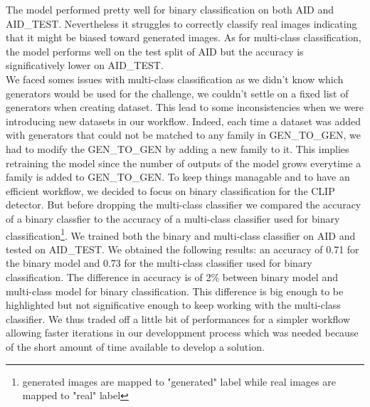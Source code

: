 \documentclass[12pt,a4paper]{article}
\begin{document}
The model performed pretty well for binary classification on both AID and AID\_TEST. Nevertheless it struggles to correctly classify real images indicating that it might be biased toward generated images. As for multi-class classification, the model performs well on the test split of AID but the accuracy is significatively lower on AID\_TEST.\\


We faced somes issues with multi-class classification as we didn't know which generators would be used for the challenge, we couldn't settle on a fixed list of generators when creating dataset. This lead to some inconsistencies when we were introducing new datasets in our workflow. Indeed, each time a dataset was added with generators that could not be matched to any family in GEN\_TO\_GEN, we had to modify the GEN\_TO\_GEN by adding a new family to it. This implies retraining the model since the number of outputs of the model grows everytime a family is added to GEN\_TO\_GEN. To keep things managable and to have an efficient workflow, we decided to focus on binary classification for the CLIP detector. But before dropping the multi-class classifier we compared the accuracy of a binary classfier to the accuracy of a multi-class classifier used for binary classification\footnote{generated images are mapped to "generated" label while real images are mapped to "real" label}. We trained both the binary and multi-class classifier on AID and tested on AID\_TEST. We obtained the following results: an accuracy of 0.71 for the binary model and 0.73 for the multi-class classifier used for binary classification. The difference in accuracy is of 2\% between binary model and multi-class model for binary classification. This difference is big enough to be highlighted but not significative enough to keep working with the multi-class classifier. We thus traded off a little bit of performances for a simpler workflow allowing faster iterations in our developpment process which was needed because of the short amount of time available to develop a solution.\\
\end{document}
